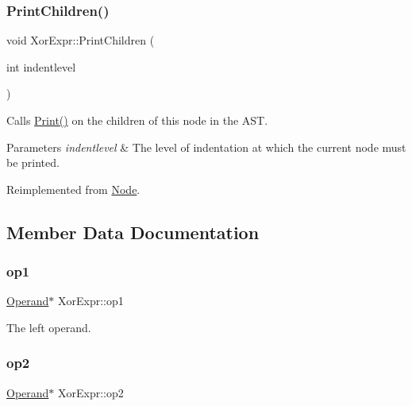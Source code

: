 \mbox{\label{class_xor_expr_a36c306045f71b8fc6448b2a74d0d4a4e}} 
\subsubsection{\texorpdfstring{Print\+Children()}{PrintChildren()}}
{\footnotesize\ttfamily void Xor\+Expr\+::\+Print\+Children (\begin{DoxyParamCaption}\item[{int}]{indentlevel }\end{DoxyParamCaption})\hspace{0.3cm}{\ttfamily [virtual]}}

Calls \hyperlink{class_node_a9ef727fd72d1a37792b3db60a8a479dd}{Print()} on the children of this node in the A\+ST. 
\begin{DoxyParams}{Parameters}
{\em indentlevel} & The level of indentation at which the current node must be printed. \\
\hline
\end{DoxyParams}


Reimplemented from \hyperlink{class_node_a3e67ec8d22182b721717af14fe0c3000}{Node}.



\subsection{Member Data Documentation}
\mbox{\label{class_xor_expr_a062091e04a196aa0932afcbe7409abce}} 
\subsubsection{\texorpdfstring{op1}{op1}}
{\footnotesize\ttfamily \hyperlink{class_operand}{Operand}$\ast$ Xor\+Expr\+::op1\hspace{0.3cm}{\ttfamily [protected]}}

The left operand. \mbox{\label{class_xor_expr_ad964f5853c06918d1e7472e921b6878b}} 
\subsubsection{\texorpdfstring{op2}{op2}}
{\footnotesize\ttfamily \hyperlink{class_operand}{Operand}$\ast$ Xor\+Expr\+::op2\hspace{0.3cm}{\ttfamily [protected]}}

